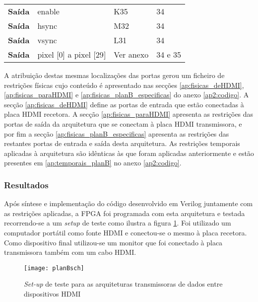 \begin{table}[h!]
\begin{tabular}{rlll}
			\multicolumn{1}{r|}{\textbf{Saída}}   & enable                                & K35                                      & 34                                         \\
			\multicolumn{1}{r|}{\textbf{Saída}}   & hsync                                 & M32                                      & 34                                         \\
			\multicolumn{1}{r|}{\textbf{Saída}}   & vsync                                 & L31                                      & 34                                         \\
			\multicolumn{1}{r|}{\textbf{Saída}}   & pixel {[}0{]} a pixel {[}29{]}        & Ver anexo                                & 34 e 35                                    \\ \hline
		\end{tabular}%
\end{table}



A atribuição destas mesmas localizações das portas gerou um ficheiro de restrições físicas cujo conteúdo é apresentado nas secções \ref{ap:fisicas_deHDMI}, \ref{ap:fisicas_paraHDMI} e \ref{ap:fisicas_planB_especificas} do anexo \ref{ap2:codigo}. A secção \ref{ap:fisicas_deHDMI} define as portas de entrada que estão conectadas à placa HDMI recetora. A secção \ref{ap:fisicas_paraHDMI} apresenta as restrições das portas de saída da arquitetura que se conectam à placa HDMI transmissora, e por fim a secção \ref{ap:fisicas_planB_especificas} apresenta as restrições das restantes portas de entrada e saída desta arquitetura. As restrições temporais aplicadas à arquitetura são idênticas às que foram aplicadas anteriormente e estão presentes em \ref{ap:temporais_planB} no anexo \ref{ap2:codigo}.

\subsubsection*{Resultados}
Após síntese e implementação do código desenvolvido em Verilog juntamente com as restrições aplicadas, a FPGA foi programada com esta arquitetura e testada recorrendo-se a um \textit{setup} de teste como ilustra a figura \ref{fig:planb_sch}. Foi utilizado um computador portátil como fonte HDMI e conectou-se o mesmo à placa recetora. Como dispositivo final utilizou-se um monitor que foi conectado à placa transmissora também com um cabo HDMI. 

\begin{figure}[h!]
	\begin{center}
		\leavevmode
		\texttt{[image: planBsch]}
		\caption{\textit{Set-up} de teste para as arquiteturas transmissoras de dados entre dispositivos HDMI}
		\label{fig:planb_sch}
	\end{center}
\end{figure}

